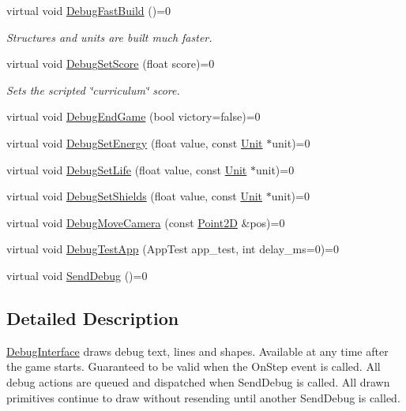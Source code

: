 \begin{DoxyCompactItemize}
\mbox{\label{classsc2_1_1_debug_interface_a75a1c2a43f05b3fcfc310d85882c63f3}} 
virtual void \hyperlink{classsc2_1_1_debug_interface_a75a1c2a43f05b3fcfc310d85882c63f3}{Debug\+Fast\+Build} ()=0
\begin{DoxyCompactList}\small\item\em Structures and units are built much faster. \end{DoxyCompactList}\item 
\mbox{\label{classsc2_1_1_debug_interface_a0e14deec5d84d341f4f3aefc29a198d5}} 
virtual void \hyperlink{classsc2_1_1_debug_interface_a0e14deec5d84d341f4f3aefc29a198d5}{Debug\+Set\+Score} (float score)=0
\begin{DoxyCompactList}\small\item\em Sets the scripted \char`\"{}curriculum\char`\"{} score. \end{DoxyCompactList}\item 
virtual void \hyperlink{classsc2_1_1_debug_interface_afba1e9cbd642833e0de4360aba7ff08e}{Debug\+End\+Game} (bool victory=false)=0
\item 
virtual void \hyperlink{classsc2_1_1_debug_interface_ad9a0d12a1cb638e2c48ecbe5fb492d00}{Debug\+Set\+Energy} (float value, const \hyperlink{classsc2_1_1_unit}{Unit} $\ast$unit)=0
\item 
virtual void \hyperlink{classsc2_1_1_debug_interface_a30ea1ea267baf1a5a0ac8f0cf9a7d679}{Debug\+Set\+Life} (float value, const \hyperlink{classsc2_1_1_unit}{Unit} $\ast$unit)=0
\item 
virtual void \hyperlink{classsc2_1_1_debug_interface_abba240758a1312682ac502f254d66d0a}{Debug\+Set\+Shields} (float value, const \hyperlink{classsc2_1_1_unit}{Unit} $\ast$unit)=0
\item 
virtual void \hyperlink{classsc2_1_1_debug_interface_aafe669615586b51805c6bf3e9cef7bf1}{Debug\+Move\+Camera} (const \hyperlink{structsc2_1_1_point2_d}{Point2D} \&pos)=0
\item 
virtual void \hyperlink{classsc2_1_1_debug_interface_a9a6fd0d4719dea83de3f5e374127a1da}{Debug\+Test\+App} (App\+Test app\+\_\+test, int delay\+\_\+ms=0)=0
\item 
virtual void \hyperlink{classsc2_1_1_debug_interface_ae08bd0e07c9ed54c61a2f35225b2efb5}{Send\+Debug} ()=0
\end{DoxyCompactItemize}


\subsection{Detailed Description}
\hyperlink{classsc2_1_1_debug_interface}{Debug\+Interface} draws debug text, lines and shapes. Available at any time after the game starts. Guaranteed to be valid when the On\+Step event is called. All debug actions are queued and dispatched when Send\+Debug is called. All drawn primitives continue to draw without resending until another Send\+Debug is called. 

